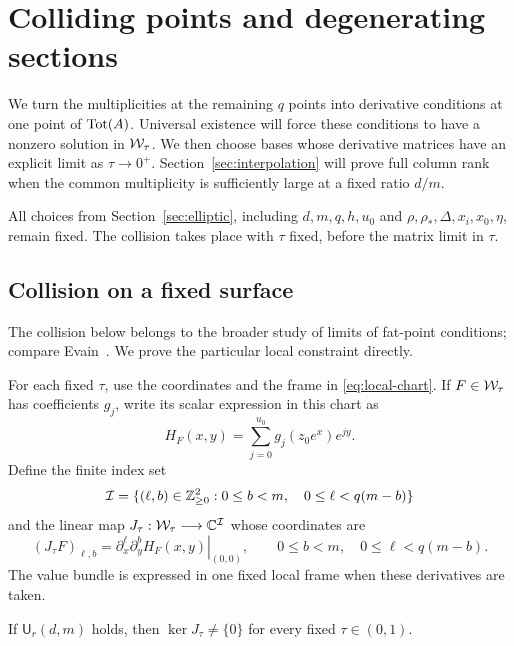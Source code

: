 \section{Colliding points and degenerating sections}
\label{sec:limits}

We turn the multiplicities at the remaining $q$ points into derivative
conditions at one point of $\operatorname{Tot}(A)$. Universal existence will force
these conditions to have a nonzero solution in $\mathcal W_\tau$. We then
choose bases whose derivative matrices have an explicit limit as
$\tau\to0^+$. Section~\ref{sec:interpolation} will prove full column
rank when the common multiplicity is sufficiently large at a fixed
ratio $d/m$.

All choices from Section~\ref{sec:elliptic}, including
$d,m,q,h,u_0$ and $\rho,\rho_*,\Delta,x_i,x_0,\eta$, remain
fixed. The collision takes place with $\tau$ fixed, before the
matrix limit in $\tau$.

\subsection{Collision on a fixed surface}

The collision below belongs to the broader study of limits of fat-point
conditions; compare Evain~\cite[Sections~2 and~6]{Evain2007}. We prove
the particular local constraint directly.

For each fixed $\tau$, use the coordinates and the frame in
\eqref{eq:local-chart}. If $F\in\mathcal W_\tau$ has coefficients $g_j$,
write its scalar expression in this chart as
\[
 H_F(x,y)=\sum_{j=0}^{u_0}g_j(z_0e^x)e^{jy}.
\]
Define the finite index set
\[
 \mathcal I=\{(\ell,b)\in\mathbb Z_{\geq0}^2:
                   0\leq b<m,\quad 0\leq\ell<q(m-b)\}
\]
and the linear map $J_\tau:\mathcal W_\tau\longrightarrow\mathbb C^{\mathcal I}$
whose coordinates are
\begin{equation}
 (J_\tau F)_{\ell,b}
   =\left.\partial_x^\ell\partial_y^b H_F(x,y)\right|_{(0,0)},
 \qquad 0\leq b<m,\quad 0\leq\ell<q(m-b).
 \label{eq:jet-rows}
\end{equation}
The value bundle is expressed in one fixed local frame when these
derivatives are taken.

\begin{lemma}
\label{lem:collision}
If $\mathsf U_r(d,m)$ holds, then $\ker J_\tau\neq\{0\}$ for
every fixed $\tau\in(0,1)$.
\end{lemma}

